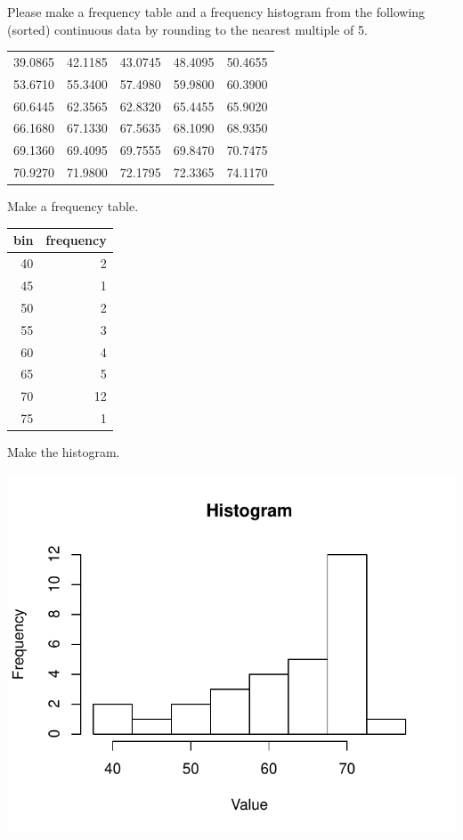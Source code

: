 
\begin{question}
Please make a frequency table and a frequency histogram from the
following (sorted) continuous data by rounding to the nearest multiple
of 5.

\begin{longtable}[]{@{}rrrrr@{}}
\toprule
\endhead
39.0865 & 42.1185 & 43.0745 & 48.4095 & 50.4655\tabularnewline
53.6710 & 55.3400 & 57.4980 & 59.9800 & 60.3900\tabularnewline
60.6445 & 62.3565 & 62.8320 & 65.4455 & 65.9020\tabularnewline
66.1680 & 67.1330 & 67.5635 & 68.1090 & 68.9350\tabularnewline
69.1360 & 69.4095 & 69.7555 & 69.8470 & 70.7475\tabularnewline
70.9270 & 71.9800 & 72.1795 & 72.3365 & 74.1170\tabularnewline
\bottomrule
\end{longtable}
\end{question}

\begin{solution}
Make a frequency table.

\begin{longtable}[]{@{}rr@{}}
\toprule
bin & frequency\tabularnewline
\midrule
\endhead
40 & 2\tabularnewline
45 & 1\tabularnewline
50 & 2\tabularnewline
55 & 3\tabularnewline
60 & 4\tabularnewline
65 & 5\tabularnewline
70 & 12\tabularnewline
75 & 1\tabularnewline
\bottomrule
\end{longtable}

Make the histogram.

\includegraphics{barchart-1-6.pdf}\\
\end{solution}

